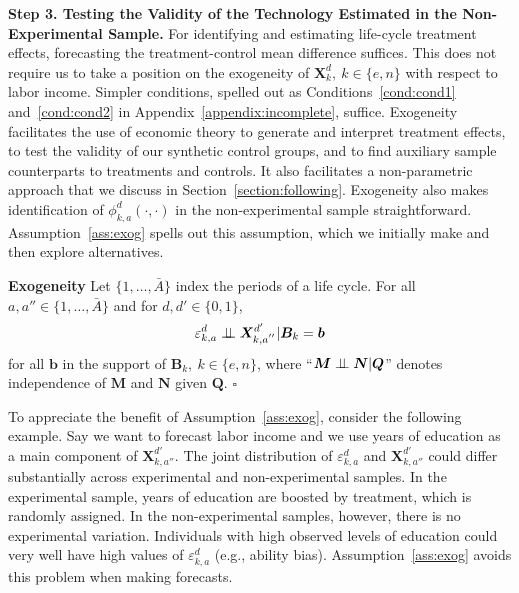 \noindent \textbf{Step 3. Testing the Validity of the Technology Estimated in the Non-Experimental Sample.} For identifying and estimating life-cycle treatment effects, forecasting the treatment-control mean difference suffices. This does not require us to take a position on the exogeneity of $\bm{X}^d_k, \: k \in \{e,n\}$ with respect to labor income. Simpler conditions, spelled out as Conditions~\ref{cond:cond1} and~\ref{cond:cond2} in Appendix~\ref{appendix:incomplete}, suffice. Exogeneity facilitates the use of economic theory to generate and interpret treatment effects, to test the validity of our synthetic control groups, and to find auxiliary sample counterparts to treatments and controls. It also facilitates a non-parametric approach that we discuss in Section~\ref{section:following}. Exogeneity also makes identification of $\phi^d_{k,a}\left( \cdot, \cdot \right)$ in the non-experimental sample straightforward. Assumption~\ref{ass:exog} spells out this assumption, which we initially make and then explore alternatives.

\onehalfspacing
\begin{assumption}\label{ass:exog} \textbf{Exogeneity}
Let $\{ 1, \ldots, \bar{A} \}$ index the periods of a life cycle. For all $a, a'' \in \{ 1, \ldots, \bar{A} \}$ and for $d, d' \in \{0,1\}$,
\begin{equation}
\varepsilon^d_{k,a} \perp\!\!\!\perp \bm{X}^{d^{\prime}}_{k,a^{''}} | \bm{B}_k = \bm{b}
\end{equation}
for all $\bm{b}$ in the support of $\bm{B}_k, \: k \in \{e,n\}$, where ``$\bm{M} \perp\!\!\!\perp \bm{N}|\bm{Q}$'' denotes independence of $\bm{M}$ and $\bm{N}$ given $\bm{Q}$. $\square$
\end{assumption}
\doublespacing

To appreciate the benefit of Assumption~\ref{ass:exog}, consider the following example. Say we want to forecast labor income and we use years of education as a main component of $\bm{X}_{k,{a''}}^{d'}$. The joint distribution of $\varepsilon_{k,a}^d$ and $\bm{X}_{k,{a''}}^{d'}$ could differ substantially across experimental and non-experimental samples. In the experimental sample, years of education are boosted by treatment, which is randomly assigned. In the non-experimental samples, however, there is no experimental variation. Individuals with high observed levels of education could very well have high values of  $\varepsilon_{k,a}^d$ (e.g., ability bias). Assumption~\ref{ass:exog} avoids this problem when making forecasts.

